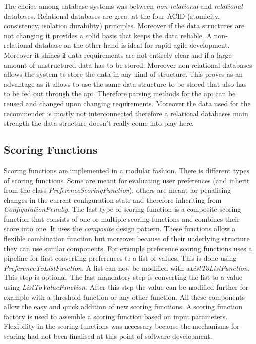 The choice among database systems was between \emph{non-relational} and \emph{relational} databases. Relational databases are great at the four ACID (atomicity, consistency, isolation durability) principles. Moreover if the data structures are not changing it provides a solid basis that keeps the data reliable. A non-relational database on the other hand is ideal for rapid agile development. Moreover it shines if data requirements are not entirely clear and if a large amount of unstructured  data has to be stored. Moreover non-relational databases allows the system to store the data in any kind of structure. This proves as an advantage as it allows to use the same data structure to be stored that also has to be fed out through the api. Therefore parsing methods for the api can be reused and changed upon changing requirements. Moreover the data used for the recommender is mostly not interconnected therefore a relational databases main strength the data structure doesn't really come into play here.

\subsection{Scoring Functions}

Scoring functions are implemented in a modular fashion. There is different types of scoring functions. Some are meant for evaluating user preferences (and inherit from the class \emph{PreferenceScoringFunction}), others are meant for penalising changes in the current configuration state and therefore inheriting from  \emph{ConfigurationPenalty}. The last type of scoring function is a composite scoring function that consists of one or multiple scoring functions and combines their score into one. It uses the \emph{composite} design pattern. These functions allow a flexible combination function but moreover because of their underlying structure they can use similar components. For example preference scoring functions uses a pipeline for first converting preferences to a list of values. This is done using \emph{PreferenceToListFunction}. A list can now be modified with a\emph{ListToListFunction}. This step is optional. The last mandatory step is converting the list to a value using \emph{ListToValueFunction}. After this step the value can be modified further for example with a threshold function or any other function. All these components allow the easy and quick addition of new scoring functions. A scoring function factory is used to assemble a scoring function based on input parameters. Flexibility in the scoring functions was necessary because the mechanisms for scoring had not been finalised at this point of software development.


